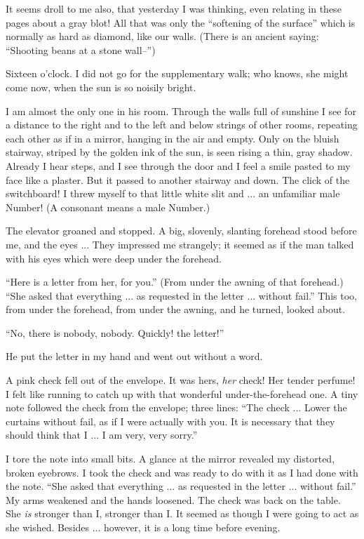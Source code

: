 \documentclass[11pt,openany]{book}
\begin{document}
It seems droll to me also, that yesterday I was thinking, even relating in these pages about a gray blot! All that was only the ``softening of the surface'' which is normally as hard as diamond, like our walls. (There is an ancient saying: ``Shooting beans at a stone wall--'')

Sixteen o'clock. I did not go for the supplementary walk; who knows, she might come now, when the sun is so noisily bright.

I am almost the only one in his room. Through the walls full of sunshine I see for a distance to the right and to the left and below strings of other rooms, repeating each other as if in a mirror, hanging in the air and empty. Only on the bluish stairway, striped by the golden ink of the sun, is seen rising a thin, gray shadow. Already I hear steps, and I see through the door and I feel a smile pasted to my face like a plaster. But it passed to another stairway and down. The click of the switchboard! I threw myself to that little white slit and ... an unfamiliar male Number! (A consonant means a male Number.)

The elevator groaned and stopped. A big, slovenly, slanting forehead stood before me, and the eyes ... They impressed me strangely; it seemed as if the man talked with his eyes which were deep under the forehead.

``Here is a letter from her, for you.'' (From under the awning of that forehead.) ``She asked that everything ... as requested in the letter ... without fail.'' This too, from under the forehead, from under the awning, and he turned, looked about.

``No, there is nobody, nobody. Quickly! the letter!''

He put the letter in my hand and went out without a word.

A pink check fell out of the envelope. It was hers, \emph{her} check! Her tender perfume! I felt like running to catch up with that wonderful under-the-forehead one. A tiny note followed the check from the envelope; three lines: ``The check ... Lower the curtains without fail, as if I were actually with you. It is necessary that they should think that I ... I am very, very sorry.''

I tore the note into small bits. A glance at the mirror revealed my distorted, broken eyebrows. I took the check and was ready to do with it as I had done with the note. ``She asked that everything ... as requested in the letter ... without fail.'' My arms weakened and the hands loosened. The check was back on the table. She \emph{is} stronger than I, stronger than I. It seemed as though I were going to act as she wished. Besides ... however, it is a long time before evening.
\end{document}
